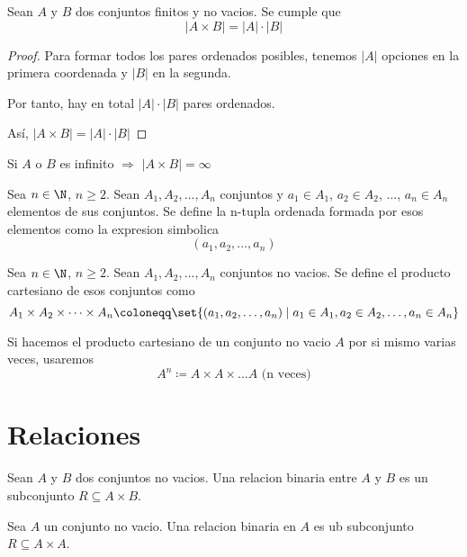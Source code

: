 \begin{proposition}
	Sean \(A \) y \(B \) dos conjuntos finitos y no vacios. Se cumple que
	\[
		| A \times B | = |A| \cdot |B|
	\]
\end{proposition}
\begin{proof}
	Para formar todos los pares ordenados posibles, tenemos \(|A| \) opciones en la primera coordenada y \(|B| \) en la segunda.

	Por tanto, hay en total \(|A| \cdot |B| \) pares ordenados.

	Así, \(|A \times B| = |A| \cdot |B|\)
\end{proof}

\begin{remark}
	Si \(A \) o \(B \) es infinito \(\Rightarrow \) \(|A \times B| = \infty\)
\end{remark}

\begin{definition}
	Sea \(n \in  \N \), \(n \geq  2 \). Sean \(A_1, A_2, \ldots, A_n \) conjuntos y \(a_1 \in  A_1 \), \(a_2 \in A_2 \), \(\ldots \), \(a_n \in A_n \) elementos de sus conjuntos. Se define la n-tupla ordenada formada por esos elementos como la expresion simbolica
	\[
		(a_1, a_2, \ldots, a_n )
	\]
\end{definition}
\begin{definition}
	Sea \(n \in \N \), \(n \geq  2\). Sean \(A_1, A_2, \ldots, A_n \) conjuntos no vacios. Se define el producto cartesiano de esos conjuntos como
	\[
		A_1 \times A_2 \times \dots \times A_n \coloneqq \set{(a_1,a_2,\dots,a_n) \mid a_1 \in A_1, a_2 \in A_2, \ldots, a_n \in A_n}
	\]

\end{definition}

Si hacemos el producto cartesiano de un conjunto no vacio \(A \) por si mismo varias veces, usaremos
\[
	A^{n} \coloneqq A \times A \times \dots A \text{ (n veces)}
\]

\section{Relaciones}

\begin{definition}
	Sean \(A \) y \(B \) dos conjuntos no vacios. Una relacion binaria entre \(A \) y \(B \) es un subconjunto \(R \subseteq A \times B \).
\end{definition}

\begin{definition}
	Sea \(A \) un conjunto no vacio. Una relacion binaria en \(A \) es ub subconjunto \(R \subseteq A \times A \).
\end{definition}

